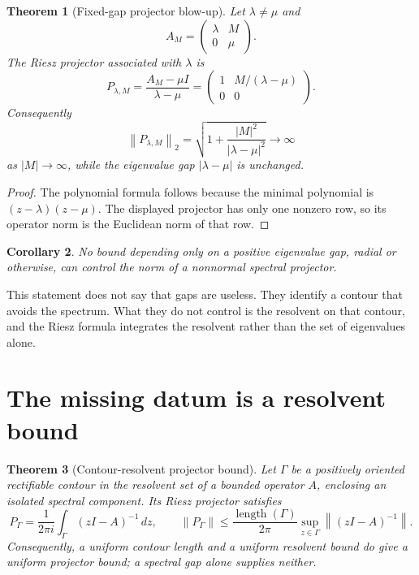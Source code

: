 \documentclass[11pt]{article}
\newtheorem{theorem}{Theorem}[section]
\newtheorem{corollary}[theorem]{Corollary}
\theoremstyle{remark}
\newcommand{\norm}[1]{\left\lVert#1\right\rVert}
\begin{document}
\begin{theorem}[Fixed-gap projector blow-up]\label{thm:fixed-gap}
Let $\lambda\ne\mu$ and
\[
 A_M=\begin{pmatrix}\lambda&M\\0&\mu\end{pmatrix}.
\]
The Riesz projector associated with $\lambda$ is
\[
 P_{\lambda,M}=\frac{A_M-\mu I}{\lambda-\mu}
 =\begin{pmatrix}1&M/(\lambda-\mu)\\0&0\end{pmatrix}.
\]
Consequently
\[
 \norm{P_{\lambda,M}}_2
 =\sqrt{1+\frac{|M|^2}{|\lambda-\mu|^2}}
 \longrightarrow\infty
\]
as $|M|\to\infty$, while the eigenvalue gap $|\lambda-\mu|$ is unchanged.
\end{theorem}

\begin{proof}
The polynomial formula follows because the minimal polynomial is
$(z-\lambda)(z-\mu)$.  The displayed projector has only one nonzero row, so
its operator norm is the Euclidean norm of that row.
\end{proof}

\begin{corollary}\label{cor:radial}
No bound depending only on a positive eigenvalue gap, radial or otherwise,
can control the norm of a nonnormal spectral projector.
\end{corollary}

This statement does not say that gaps are useless.  They identify a contour
that avoids the spectrum.  What they do not control is the resolvent on that
contour, and the Riesz formula integrates the resolvent rather than the set of
eigenvalues alone.

\section{The missing datum is a resolvent bound}

\begin{theorem}[Contour-resolvent projector bound]\label{thm:contour}
Let $\Gamma$ be a positively oriented rectifiable contour in the resolvent
set of a bounded operator $A$, enclosing an isolated spectral component.
Its Riesz projector satisfies
\[
 P_\Gamma=\frac{1}{2\pi i}\int_\Gamma(zI-A)^{-1}\,dz,
 \qquad
 \norm{P_\Gamma}
 \le \frac{\operatorname{length}(\Gamma)}{2\pi}
       \sup_{z\in\Gamma}\norm{(zI-A)^{-1}}.
\]
Consequently, a uniform contour length and a uniform resolvent bound do give
a uniform projector bound; a spectral gap alone supplies neither.
\end{theorem}
\end{document}
